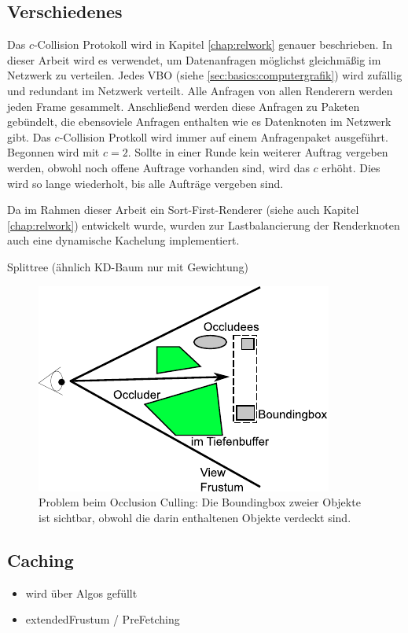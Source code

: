 \subsection{Verschiedenes}
Das $c$-Collision Protokoll wird in Kapitel \ref{chap:relwork} genauer beschrieben. In dieser Arbeit wird es verwendet, um Datenanfragen möglichst gleichmäßig im Netzwerk zu verteilen. Jedes VBO (siehe \ref{sec:basics:computergrafik}) wird zufällig und redundant im Netzwerk verteilt. Alle Anfragen von allen Renderern werden jeden Frame gesammelt. Anschließend werden diese Anfragen zu Paketen gebündelt, die ebensoviele Anfragen enthalten wie es Datenknoten im Netzwerk gibt. Das $c$-Collision Protkoll wird immer auf einem Anfragenpaket ausgeführt. Begonnen wird  mit $c = 2$. Sollte in einer Runde kein weiterer Auftrag vergeben werden, obwohl noch offene Auftrage vorhanden sind, wird das $c$ erhöht. Dies wird so lange wiederholt, bis alle Aufträge vergeben sind.

Da im Rahmen dieser Arbeit ein Sort-First-Renderer (siehe auch Kapitel \ref{chap:relwork}) entwickelt wurde, wurden zur Lastbalancierung der Renderknoten auch eine dynamische Kachelung implementiert.

Splittree (ähnlich KD-Baum nur mit Gewichtung)

\begin{figure}
  \centering
  \includegraphics[scale=0.8]{images/oculling.pdf}
  \caption{Problem beim Occlusion Culling: Die Boundingbox zweier Objekte ist sichtbar, obwohl die darin enthaltenen Objekte verdeckt sind.}
  \label{fig:basics:oculling}
\end{figure}

\subsection{Caching}
\label{sec:basics:caching}
\begin{itemize}
  \item wird über Algos gefüllt
  \item extendedFrustum / PreFetching 
\end{itemize}

